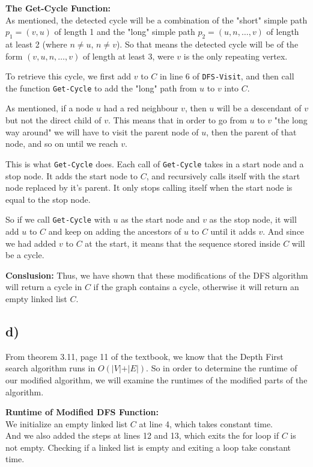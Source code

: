 \documentclass{article}
\begin{document}
\textbf{The Get-Cycle Function:}\\
As mentioned, the detected cycle will be a combination of the "short" simple path $p_1 = (v, u)$ of length 1 and the "long" simple path $p_2 = (u, n, \dots, v)$ of length at least 2 (where $n \neq u$, $n \neq v$).
So that means the detected cycle will be of the form $(v, u, n, \dots, v)$ of length at least 3, were $v$ is the only repeating vertex.

To retrieve this cycle, we first add $v$ to $C$ in line 6 of \texttt{DFS-Visit}, and then call the function \texttt{Get-Cycle} to add the "long" path from $u$ to $v$ into $C$. 

As mentioned, if a node $u$ had a red neighbour $v$, then $u$ will be a descendant of $v$ but not the direct child of $v$. This means that in order to go from $u$ to $v$ "the long way around" we will have to visit the parent node of $u$, then the parent of that node, and so on until we reach $v$.

This is what \texttt{Get-Cycle} does. Each call of \texttt{Get-Cycle} takes in a start node and a stop node. It adds the start node to $C$, and recursively calls itself with the start node replaced by it's parent. It only stops calling itself when the start node is equal to the stop node.

So if we call \texttt{Get-Cycle} with $u$ as the start node and $v$ as the stop node, it will add $u$ to $C$ and keep on adding the ancestors of $u$ to $C$ until it adds $v$.
And since we had added $v$ to $C$ at the start, it means that the sequence stored inside $C$ will be a cycle.

\textbf{Conslusion:}
Thus, we have shown that these modifications of the DFS algorithm will return a cycle in $C$ if the graph contains a cycle, otherwise it will return an empty linked list $C$.

\subsection*{d)}
From theorem 3.11, page 11 of the textbook, we know that the Depth First search algorithm runs in $O(\vert V\vert + \vert E\vert)$. So in order to determine the runtime of our modified algorithm, we will examine the runtimes of the modified parts of the algorithm.

\textbf{Runtime of Modified DFS Function:}\\ 
We initialize an empty linked list $C$ at line 4, which takes constant time.\\ 
And we also added the steps at lines 12 and 13, which exits the for loop if $C$ is not empty. Checking if a linked list is empty and exiting a loop take constant time. 
\end{document}
